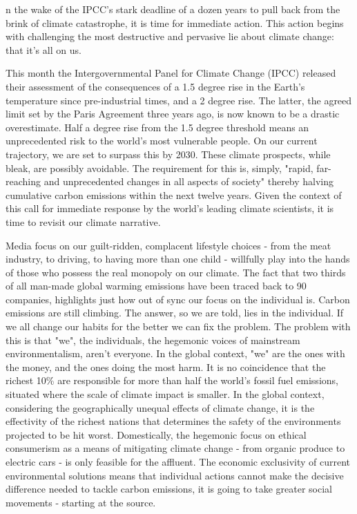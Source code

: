 
{\flushright{}}
\smallskip

n the wake of the IPCC's stark deadline of a dozen years to pull back from
the brink of climate catastrophe, it is time for immediate action. This
action begins with challenging the most destructive and pervasive lie about
climate change: that it's all on us.

   This month the Intergovernmental Panel for Climate Change (IPCC)
   released their assessment of the consequences of a 1.5 degree rise in
   the Earth's temperature since pre-industrial times, and a 2 degree
   rise. The latter, the agreed limit set by the Paris Agreement three
   years ago, is now known to be a drastic overestimate. Half a degree
   rise from the 1.5 degree threshold means an unprecedented risk to the
   world's most vulnerable people. On our current trajectory, we are set
   to surpass this by 2030. These climate prospects, while bleak, are
   possibly avoidable. The requirement for this is, simply, "rapid,
   far-reaching and unprecedented changes in all aspects of society"
   thereby halving cumulative carbon emissions within the next twelve
   years. Given the context of this call for immediate response by the
   world's leading climate scientists, it is time to revisit our climate
   narrative.

   Media focus on our guilt-ridden, complacent lifestyle choices - from
   the meat industry, to driving, to having more than one child -
   willfully play into the hands of those who possess the real monopoly on
   our climate. The fact that two thirds of all man-made global warming
   emissions have been traced back to 90 companies, highlights just how
   out of sync our focus on the individual is. Carbon emissions are still
   climbing. The answer, so we are told, lies in the individual. If we all
   change our habits for the better we can fix the problem. The problem
   with this is that "we", the individuals, the hegemonic voices of
   mainstream environmentalism, aren't everyone. In the global context,
   "we" are the ones with the money, and the ones doing the most harm. It
   is no coincidence that the richest 10\% are responsible for more than
   half the world's fossil fuel emissions, situated where the scale of
   climate impact is smaller. In the global context, considering the
   geographically unequal effects of climate change, it is the effectivity
   of the richest nations that determines the safety of the environments
   projected to be hit worst. Domestically, the hegemonic focus on ethical
   consumerism as a means of mitigating climate change - from organic
   produce to electric cars - is only feasible for the affluent. The
   economic exclusivity of current environmental solutions means that
   individual actions cannot make the decisive difference needed to tackle
   carbon emissions, it is going to take greater social movements -
   starting at the source.

